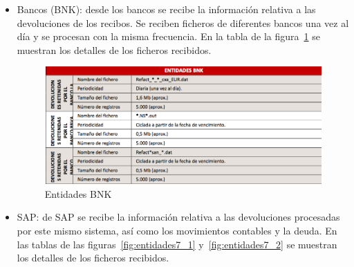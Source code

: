 \documentclass[a4paper, 12pt]{book}
\begin{document}
\begin{itemize}
	\item Bancos (BNK): desde los bancos se recibe la información relativa a las devoluciones de los recibos. Se reciben ficheros de diferentes bancos una vez al día y se procesan con la misma frecuencia. En la tabla de la figura~\ref{fig:entidades6} se muestran los detalles de los ficheros recibidos.

	\begin{figure}
	  \centering
	  \includegraphics[width=14cm, keepaspectratio]{img/entidades6}
	  \caption{Entidades BNK}
	  \label{fig:entidades6}
	\end{figure}

	\item SAP: de SAP se recibe la información relativa a las devoluciones procesadas por este mismo sistema, así como los movimientos contables y la deuda. En las tablas de las figuras~\ref{fig:entidades7_1} y~\ref{fig:entidades7_2} se muestran los detalles de los ficheros recibidos.


\end{itemize}
\end{document}

